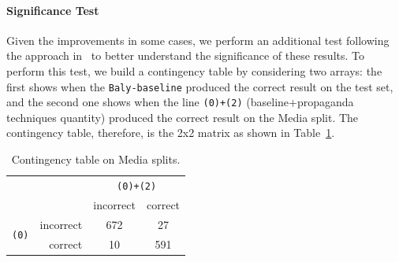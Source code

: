 
\paragraph{Significance Test}

Given the improvements in some cases, we perform an additional test following the approach in~\citet{mcnemar1947note} 
to better understand the significance of these results. %
To perform this test, we build a contingency table by considering two arrays: the first shows when the \texttt{Baly-baseline} produced the correct result on the test set, and the second one shows when the line \texttt{(0)+(2)} (baseline+propaganda techniques quantity) produced the correct result on the Media split. The contingency table, therefore, is the 2x2 matrix as shown in 
Table~\ref{tab:contingency2}.


\begin{table}[]
    \centering
\small
    \begin{tabular}{rr|c|c}
        & & \multicolumn{2}{c}{\texttt{(0)+(2)}} \\
         & & incorrect & correct \\
         \hline
        \multirow{2}{*}{\texttt{(0)}} & incorrect & 672 & 27 \\
        & correct & 10 & 591
    \end{tabular}
    \caption{Contingency table on Media splits.}
    \label{tab:contingency2}
\end{table}


